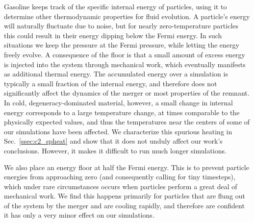 Gasoline keeps track of the {\charles specific} internal energy of particles, using it to determine other thermodynamic properties for fluid evolution.  A particle's energy will naturally fluctuate due to noise, but for nearly zero-temperature particles this could result in their energy dipping below the Fermi energy.  In such situations we keep the pressure at the Fermi pressure, while letting the energy freely evolve.  A consequence of the floor is that a small amount of excess energy is injected into the system through mechanical work, which eventually manifests as additional thermal energy.  The accumulated energy over a simulation is typically a small fraction of the internal energy, and therefore does not significantly affect the dynamics of the merger or most properties of the remnant.  In cold, degeneracy-dominated material, however, a small change in internal energy corresponds to a large temperature change, at times comparable to the physically expected values, and thus the temperatures near the centers of some of our simulations have been affected.  We characterize this spurious heating in Sec.~\ref{ssec:c2_spheat} and show that it does not unduly affect our work's conclusions.  However, it makes it difficult to run much longer simulations.

We also place an energy floor at half the Fermi energy.  This is to prevent particle energies from approaching zero (and consequently calling for tiny timesteps), which under rare circumstances occurs when particles perform a great deal of mechanical work.  We find this happens primarily for particles that are flung out of the system by the merger and are cooling rapidly, and therefore are confident it has only a very minor effect on our simulations.



